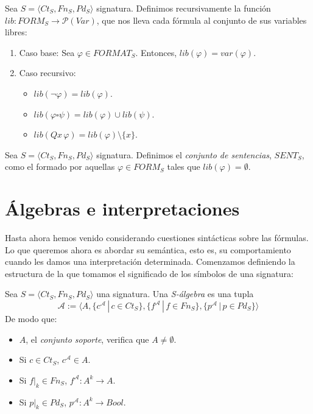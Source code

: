 \begin{definition}
Sea $S = \langle Ct_{S}, Fn_{S}, Pd_{S}\rangle$ signatura. Definimos recursivamente la función $lib: FORM_S \rightarrow \mathcal{P}(Var)$, que nos lleva cada fórmula al conjunto de sus variables libres:
\begin{enumerate}
    \item Caso base: Sea $\varphi \in FORMAT_S$. Entonces, $lib(\varphi) = var(\varphi)$.
    \item Caso recursivo: 
        \begin{itemize}
            \item $lib(\neg \varphi) = lib(\varphi)$.
            \item $lib(\varphi \square \psi) = lib(\varphi) \cup lib(\psi)$.
            \item $lib(Qx \, \varphi) = lib(\varphi) \setminus \{x\}$.
        \end{itemize}
\end{enumerate}
\end{definition}

\begin{definition}
Sea $S = \langle Ct_{S}, Fn_{S}, Pd_{S}\rangle$ signatura. Definimos el \textit{conjunto de sentencias}, $SENT_S$, como el formado por aquellas $\varphi \in FORM_S$ tales que $lib(\varphi) = \emptyset$.
\end{definition}


\section{Álgebras e interpretaciones}
Hasta ahora hemos venido considerando cuestiones sintácticas sobre las fórmulas. Lo que queremos ahora es abordar su semántica, esto es, su comportamiento cuando les damos una interpretación determinada. Comenzamos definiendo la estructura de la que tomamos el significado de los símbolos de una signatura:

\begin{definition}
Sea $S = \langle Ct_{S}, Fn_{S}, Pd_{S}\rangle$ una signatura. Una \textit{S-álgebra} es una tupla 
$$\mathcal{A} := \langle A, \{ c^{\mathcal{A}} \, | \, c \in Ct_S\}, \{f^{\mathcal{A}} \, | \, f \in Fn_S\}, \{p^{\mathcal{A}} \, | \, p \in Pd_S\}\rangle$$
De modo que:
\begin{itemize}
    \item $A$, el \textit{conjunto soporte}, verifica que $A \neq \emptyset$.
    \item Si $c \in Ct_S$, $c^{\mathcal{A}} \in A$.
    \item Si $f|_k \in Fn_S$, $f^{\mathcal{A}}: A^{k} \rightarrow A$.
    \item Si $p|_k \in Pd_S$, $p^{\mathcal{A}}: A^{k} \rightarrow Bool$.
\end{itemize}
\end{definition}

